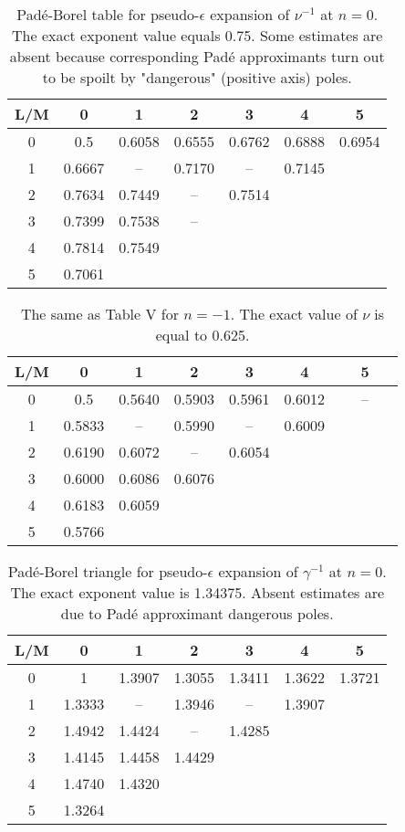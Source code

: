 \documentclass[aps,prb,preprint,showpacs,preprintnumbers,amsmath,amssymb]{revtex4}
\begin{document}
\begin{table}[t]
\caption{Pad\'e-Borel table for pseudo-$\epsilon$ expansion of $\nu^{-1}$ at $n = 0$.
The exact exponent value equals 0.75. Some estimates are absent because corresponding
Pad\'e approximants turn out to be spoilt by "dangerous" (positive axis) poles.}
\label{tab5}
\renewcommand{\tabcolsep}{0.4cm}
\begin{tabular}{|*{7}{c|}}\hline
L/M& 0& 1 & 2 & 3 & 4 & 5\\ \hline
0 & 0.5 & 0.6058 & 0.6555 & 0.6762 & 0.6888 & 0.6954 \\ \hline
1 & 0.6667 & -- & 0.7170 & -- & 0.7145 & \\ \hline
2 & 0.7634 & 0.7449 & -- & 0.7514& & \\ \hline
3 & 0.7399 & 0.7538 & -- & & & \\ \hline
4 & 0.7814 & 0.7549 & & & & \\ \hline
5 & 0.7061 & & & & & \\ \hline
\end{tabular}
\end{table}

\begin{table}[t]
\caption{The same as Table V for $n = -1$. The exact value of $\nu$ is equal to 0.625.}
\label{tab6}
\renewcommand{\tabcolsep}{0.4cm}
\begin{tabular}{|*{7}{c|}}\hline
L/M & 0 & 1 & 2 & 3 & 4 & 5\\ \hline
0 & 0.5 & 0.5640 & 0.5903 & 0.5961 & 0.6012 & ~~~--~~~ \\ \hline
1 & 0.5833 & -- & 0.5990 & -- & 0.6009 & \\ \hline
2 & 0.6190 & 0.6072 & -- & 0.6054 & & \\ \hline
3 & 0.6000 & 0.6086 & 0.6076 & & & \\ \hline
4 & 0.6183 & 0.6059 & & & & \\ \hline
5 & 0.5766 & & & & & \\ \hline
\end{tabular}
\end{table}

\begin{table}[t]
\caption{Pad\'e-Borel triangle for pseudo-$\epsilon$ expansion of $\gamma^{-1}$ at $n = 0$.
The exact exponent value is 1.34375. Absent estimates are due to Pad\'e approximant
dangerous poles.}
\label{tab7}
\renewcommand{\tabcolsep}{0.4cm}
\begin{tabular}{|*{7}{c|}}\hline
L/M & 0 & 1 & 2 & 3 & 4 & 5 \\ \hline
0 & 1 & 1.3907 & 1.3055 & 1.3411 & 1.3622 & 1.3721 \\ \hline
1 & 1.3333 & -- & 1.3946 & -- & 1.3907 & \\ \hline
2 & 1.4942 & 1.4424 & -- & 1.4285 & & \\ \hline
3 & 1.4145 & 1.4458 & 1.4429 & & & \\ \hline
4 & 1.4740 & 1.4320 & & & & \\ \hline
5 & 1.3264 & & & & & \\ \hline
\end{tabular}
\end{table}
\end{document}

